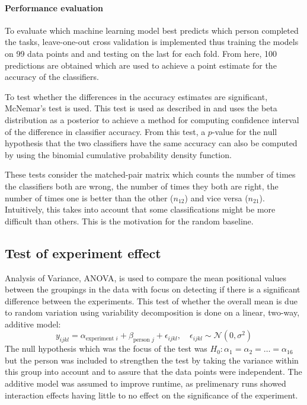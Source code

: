 \documentclass[11pt,fleqn]{article}
\begin{document}
\paragraph{Performance evaluation}
To evaluate which machine learning model best predicts which person completed the tasks, leave-one-out cross validation is implemented thus training the models on 99 data points and and testing on the last for each fold.
From here, 100 predictions are obtained which are used to achieve a point estimate for the accuracy of the classifiers.

To test whether the differences in the accuracy estimates are significant, McNemar's test is used. 
This test is used as described in \cite[Method 11.3.2]{Tue} and uses the beta distribution as a posterior to achieve a method for computing confidence interval of the difference in classifier accuracy.
From this test, a \(p\)-value for the null hypothesis that the two classifiers have the same accuracy can also be computed by using the binomial cumulative probability density function.

These tests consider the matched-pair matrix which counts the number of times the classifiers both are wrong, the number of times they both are right, the number of times one is better than the other (\(n_{12}\)) and vice versa (\(n_{21}\)).
Intuitively, this takes into account that some classifications might be more difficult than others. 
This is the motivation for the random baseline.


\subsection{Test of experiment effect}\label{subsec:expeffect}
Analysis of Variance, ANOVA, is used to compare the mean positional values between the groupings in the data with focus on detecting if there is a significant difference between the experiments.
This test of whether the overall mean is due to random variation using variability decomposition is done on a linear, two-way, additive model:
\[
	y_{ijkl} = \alpha_{\text{experiment } i}+
	\beta_{\text{person } j}
	+ \epsilon_{ijkl}, \quad \epsilon_{ijkl} \sim \mathcal N (0, \sigma^2)
\]
The null hypothesis which was the focus of the test was $ H_0: \alpha_1=\alpha_2=\ldots=\alpha_{16} $ but the person was included to strengthen the test by taking the variance within this group into account and to assure that the data points were independent. 
The additive model was assumed to improve runtime, as prelimenary runs showed interaction effects having little to no effect on the significance of the experiment.
\end{document}
